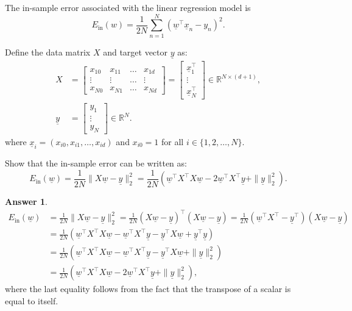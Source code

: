 \documentclass{article}
\newcommand{\setR}{\mathbb{R}}
\renewcommand{\vec}[1]{\underline{#1}}
\newcommand{\vecw}{\vec{w}}
\newcommand{\vecx}{\vec{x}}
\newcommand{\vecy}{\vec{y}}
\theoremstyle{definition}
\newtheorem*{answer}{Answer}
\begin{document}
\begin{question}[start=0]
	The in-sample error associated with the linear regression model is
	\begin{equation}\label{eq_form1}
		E_{\text{in}}(w) = \frac{1}{2N} \sum_{n=1}^N (\vecw^\top \vecx_n - y_n)^2.
	\end{equation}
	
	Define the data matrix $X$ and target vector $\vec{y}$ as:
	\begin{align*}
		X &= \begin{bmatrix}
		x_{10} & x_{11} & \dots & x_{1d} \\
		\vdots & \vdots & \dots & \vdots \\
		x_{N0} & x_{N1} & \dots & x_{Nd}
	\end{bmatrix}=\begin{bmatrix}
	\vecx_{1}^\top \\
	\vdots \\
	\vecx_{N}^\top
	\end{bmatrix} \in \setR^{N \times (d+1)},\\
	\vec{y} &= \begin{bmatrix}
		y_1 \\
		\vdots \\
		y_N
	\end{bmatrix}\in \setR^{N}.
\end{align*}
where $\vecx_{i} = (x_{i0}, x_{i1}, \ldots, x_{id})$ and $x_{i0}=1$ for all $i \in \{1, 2, \ldots, N\}$.
	\begin{question}
		\item Show that the in-sample error can be written as:
		\begin{equation}\label{eq_form2}
			E_{\text{in}}(\vecw) = \frac{1}{2N} \|X\vecw - \vecy\|_2^2 = \frac{1}{2N}\left(\vecw^\top X^\top X \vecw - 2\vecw^\top X^\top \vecy + \|\vecy\|_2^2\right).
		\end{equation}
		\begin{answer}
			\begin{align*}
				E_{\text{in}}(\vecw) &= \frac{1}{2N} \|X\vecw - \vecy\|_2^2 = \frac{1}{2N} (X\vecw - \vecy)^\top (X\vecw - \vecy) = \frac{1}{2N} (\vecw^\top X^\top - \vecy^\top) (X\vecw - \vecy)\\
				&= \frac{1}{2N} (\vecw^\top X^\top X\vecw - \vecw^\top X^\top \vecy - \vecy^\top X\vecw + \vecy^\top \vecy)\\
				&= \frac{1}{2N}\left(\vecw^\top X^\top X \vecw - \vecw^\top X^\top \vecy - \vecy^\top X\vecw + \|\vecy\|_2^2\right)\\
				&= \frac{1}{2N}\left(\vecw^\top X^\top X \vecw - 2\vecw^\top X^\top \vecy + \|\vecy\|_2^2\right),
			\end{align*}
			where the last equality follows from the fact that the transpose of a scalar is equal to itself.
		\end{answer}


\end{question}
\end{question}
\end{document}
